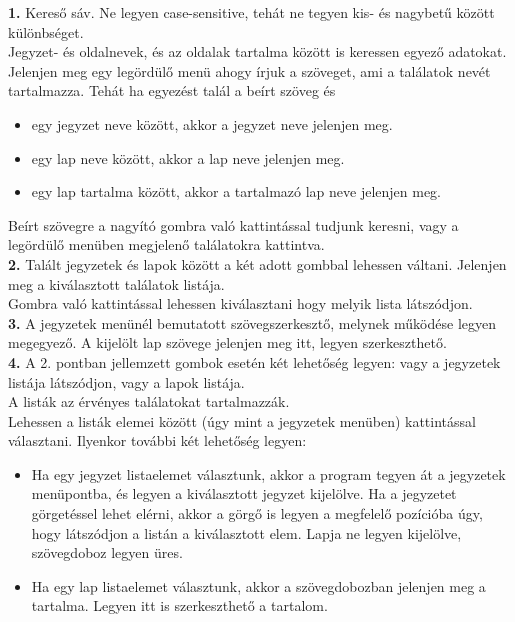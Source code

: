 \vspace{5pt} \noindent \textbf{1.} Kereső sáv. Ne legyen case-sensitive, tehát ne tegyen kis- és nagybetű között különbséget.
\\Jegyzet- és oldalnevek, és az oldalak tartalma között is keressen egyező adatokat.
\\Jelenjen meg egy legördülő menü ahogy írjuk a szöveget, ami a találatok nevét tartalmazza. Tehát ha egyezést talál a beírt szöveg és 
\begin{itemize}
	\item egy jegyzet neve között, akkor a jegyzet neve jelenjen meg.
	\item egy lap neve között, akkor a lap neve jelenjen meg.
	\item egy lap tartalma között, akkor a tartalmazó lap neve jelenjen meg.
\end{itemize}
Beírt szövegre a nagyító gombra való kattintással tudjunk keresni, vagy a legördülő menüben megjelenő találatokra kattintva. 
\vspace{5pt} \\ \textbf{2.} Talált jegyzetek és lapok között a két adott gombbal lehessen váltani. Jelenjen meg a kiválasztott találatok listája.
\\Gombra való kattintással lehessen kiválasztani hogy melyik lista látszódjon.
\vspace{5pt} \\ \textbf{3.} A jegyzetek menünél bemutatott szövegszerkesztő, melynek működése legyen megegyező.
A kijelölt lap szövege jelenjen meg itt, legyen szerkeszthető.
\vspace{5pt} \\ \textbf{4.} A 2. pontban jellemzett gombok esetén két lehetőség legyen: vagy a jegyzetek listája látszódjon, vagy a lapok listája. 
\\A listák az érvényes találatokat tartalmazzák.
\\Lehessen a listák elemei között (úgy mint a jegyzetek menüben) kattintással választani. Ilyenkor további két lehetőség legyen:
\begin{itemize}
	\item Ha egy jegyzet listaelemet választunk, akkor a program tegyen át a jegyzetek menüpontba, és legyen a kiválasztott jegyzet kijelölve. Ha a jegyzetet görgetéssel lehet elérni, akkor a görgő is legyen a megfelelő pozícióba úgy, hogy látszódjon a listán a kiválasztott elem. Lapja ne legyen kijelölve, szövegdoboz legyen üres.
	\item Ha egy lap listaelemet választunk, akkor a szövegdobozban jelenjen meg a  tartalma. Legyen itt is szerkeszthető a tartalom.
\end{itemize}

